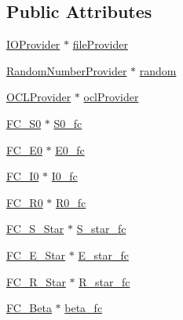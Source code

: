 \subsection*{Public Attributes}
\begin{DoxyCompactItemize}
\item 
\hyperlink{classSpatialSEIR_1_1IOProvider}{I\-O\-Provider} $\ast$ \hyperlink{classSpatialSEIR_1_1ModelContext_a388cbd8cccf85afc2ffee74f008e63e0}{file\-Provider}
\item 
\hyperlink{classSpatialSEIR_1_1RandomNumberProvider}{Random\-Number\-Provider} $\ast$ \hyperlink{classSpatialSEIR_1_1ModelContext_a752872a2e8bb09bbf8b2c400860f5c33}{random}
\item 
\hyperlink{classSpatialSEIR_1_1OCLProvider}{O\-C\-L\-Provider} $\ast$ \hyperlink{classSpatialSEIR_1_1ModelContext_ab18c5fa9393c61d1936880776f534d62}{ocl\-Provider}
\item 
\hyperlink{classSpatialSEIR_1_1FC__S0}{F\-C\-\_\-\-S0} $\ast$ \hyperlink{classSpatialSEIR_1_1ModelContext_ab45d23e96fb44d1758dc73ea1a11629f}{S0\-\_\-fc}
\item 
\hyperlink{classSpatialSEIR_1_1FC__E0}{F\-C\-\_\-\-E0} $\ast$ \hyperlink{classSpatialSEIR_1_1ModelContext_a677ffe9133f332b346d7b1652d95552f}{E0\-\_\-fc}
\item 
\hyperlink{classSpatialSEIR_1_1FC__I0}{F\-C\-\_\-\-I0} $\ast$ \hyperlink{classSpatialSEIR_1_1ModelContext_a595c21a8b6130f09e3a2af6e114fe9da}{I0\-\_\-fc}
\item 
\hyperlink{classSpatialSEIR_1_1FC__R0}{F\-C\-\_\-\-R0} $\ast$ \hyperlink{classSpatialSEIR_1_1ModelContext_a080fbc05c16a279300a4b1f7957592f8}{R0\-\_\-fc}
\item 
\hyperlink{classSpatialSEIR_1_1FC__S__Star}{F\-C\-\_\-\-S\-\_\-\-Star} $\ast$ \hyperlink{classSpatialSEIR_1_1ModelContext_adeacc82667f794bca82d60daeb03cd9d}{S\-\_\-star\-\_\-fc}
\item 
\hyperlink{classSpatialSEIR_1_1FC__E__Star}{F\-C\-\_\-\-E\-\_\-\-Star} $\ast$ \hyperlink{classSpatialSEIR_1_1ModelContext_ab2ceb1ec8e001f4d4f63eddfc0c44021}{E\-\_\-star\-\_\-fc}
\item 
\hyperlink{classSpatialSEIR_1_1FC__R__Star}{F\-C\-\_\-\-R\-\_\-\-Star} $\ast$ \hyperlink{classSpatialSEIR_1_1ModelContext_a0f77d6658696a3c2fa584caa036135a5}{R\-\_\-star\-\_\-fc}
\item 
\hyperlink{classSpatialSEIR_1_1FC__Beta}{F\-C\-\_\-\-Beta} $\ast$ \hyperlink{classSpatialSEIR_1_1ModelContext_a63278983ee123db534919685c46fbb5b}{beta\-\_\-fc}
\item 

\end{DoxyCompactItemize}
